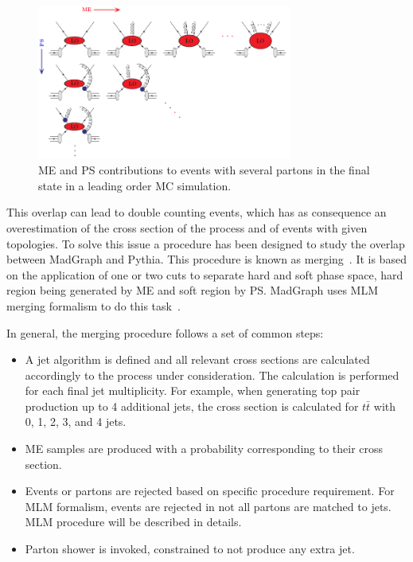\begin{figure}[!Hhtbp]
  \begin{center}
    \includegraphics[width=0.75\textwidth]{figs/PSMEInterface.png}
    \caption{ME and PS contributions to events with several partons in the final state in a leading order MC simulation.}
    \label{fig:PSME}
  \end{center}
\end{figure}

This overlap can lead to double counting events, which has as consequence an overestimation of the cross section of the process and of events with given topologies. To solve this issue a procedure has been designed to study the overlap between MadGraph and Pythia. This procedure is known as merging~\cite{Alwall:2007fs, Alwall:2008qv, Lavesson:2007uu}. It is based on the application of one or two cuts to separate hard and soft phase space, hard region being generated by ME and soft region by PS. MadGraph uses MLM merging formalism to do this task~\cite{Mangano:2001xp, Mangano:2006rw}. 

In general, the merging procedure follows a set of common steps:
\begin{itemize}
\item A jet algorithm is defined and all relevant cross sections are calculated accordingly to the process under consideration. The calculation is performed for each final jet multiplicity. For example, when generating top pair production up to 4 additional jets, the cross section is calculated for $t\bar{t}$ with 0, 1, 2, 3, and 4 jets. 
\item ME samples are produced with a probability corresponding to their cross section.
\item Events or partons are rejected based on specific procedure requirement. For MLM formalism, events are rejected in not all partons are matched to jets. MLM procedure will be described in details. 
\item Parton shower is invoked, constrained to not produce any extra jet.
\end{itemize}

